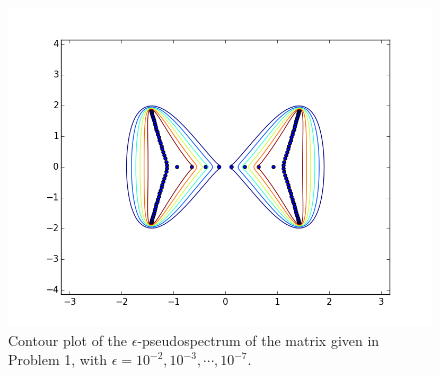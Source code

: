 \begin{figure}
\begin{center}
\includegraphics[width=\textwidth]{ps_contour}
\caption{Contour plot of the $\epsilon$-pseudospectrum of the matrix given in Problem 1, with $\epsilon=10^{-2},10^{-3},\cdots,10^{-7}$. }
\label{fig:ps_contour}
\end{center}
\end{figure}



